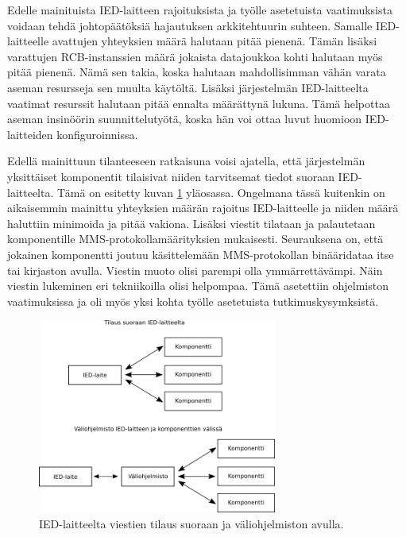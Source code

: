 Edelle mainituista IED-laitteen rajoituksista ja työlle asetetuista vaatimuksista voidaan tehdä johtopäätöksiä hajautuksen arkkitehtuurin suhteen. Samalle IED-laitteelle avattujen yhteyksien määrä halutaan pitää pienenä. Tämän lisäksi varattujen RCB-instanssien määrä jokaista datajoukkoa kohti halutaan myös pitää pienenä. Nämä sen takia, koska halutaan mahdollisimman vähän varata aseman resursseja sen muulta käytöltä. Lisäksi järjestelmän IED-laitteelta vaatimat resurssit halutaan pitää ennalta määrättynä lukuna. Tämä helpottaa aseman insinöörin suunnittelutyötä, koska hän voi ottaa luvut huomioon IED-laitteiden konfiguroinnissa.

Edellä mainittuun tilanteeseen ratkaisuna voisi ajatella, että järjestelmän yksittäiset komponentit tilaisivat niiden tarvitsemat tiedot suoraan IED-laitteelta. Tämä on esitetty kuvan \ref{fig:architecture-analysis} yläosassa. Ongelmana tässä kuitenkin on aikaisemmin mainittu yhteyksien määrän rajoitus IED-laitteelle ja niiden määrä haluttiin minimoida ja pitää vakiona. Lisäksi viestit tilataan ja palautetaan komponentille MMS-protokollamäärityksien mukaisesti. Seurauksena on, että jokainen komponentti joutuu käsittelemään MMS-protokollan binääridataa itse tai kirjaston avulla. Viestin muoto olisi parempi olla ymmärrettävämpi. Näin viestin lukeminen eri tekniikoilla olisi helpompaa. Tämä asetettiin ohjelmiston vaatimuksissa ja oli myös yksi kohta työlle asetetuista tutkimuskysymksistä.

\begin{figure}[ht!]
	\includegraphics[width=0.7\textwidth]{pictures/architecture-analysis.png}
	\caption{IED-laitteelta viestien tilaus suoraan ja väliohjelmiston avulla.}
	\label{fig:architecture-analysis}
\end{figure}


